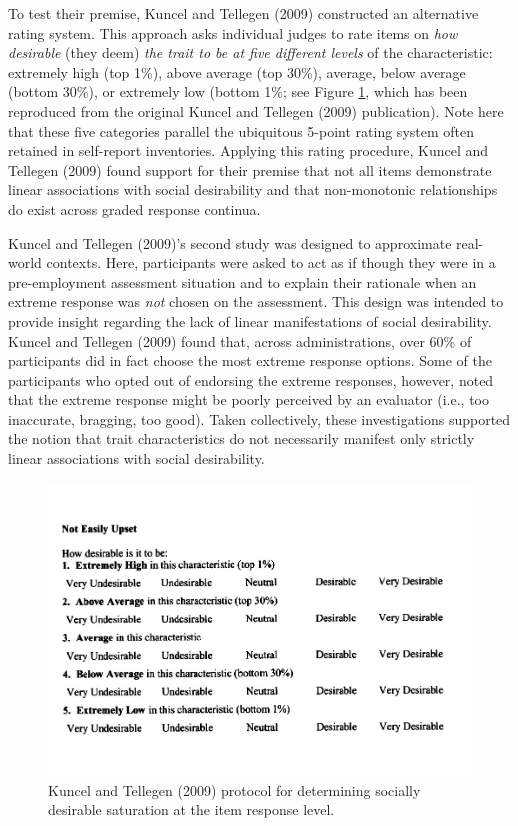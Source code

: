 \documentclass[
  ,jou]{apa6}
\begin{document}
To test their premise, Kuncel and Tellegen (2009) constructed an alternative rating system. This approach asks individual judges to rate items on \emph{how desirable} (they deem) \emph{the trait to be at five different levels} of the characteristic: extremely high (top 1\%), above average (top 30\%), average, below average (bottom 30\%), or extremely low (bottom 1\%; see Figure \ref{fig:Figure1}, which has been reproduced from the original Kuncel and Tellegen (2009) publication). Note here that these five categories parallel the ubiquitous 5-point rating system often retained in self-report inventories. Applying this rating procedure, Kuncel and Tellegen (2009) found support for their premise that not all items demonstrate linear associations with social desirability and that non-monotonic relationships do exist across graded response continua.

Kuncel and Tellegen (2009)'s second study was designed to approximate real-world contexts. Here, participants were asked to act as if though they were in a pre-employment assessment situation and to explain their rationale when an extreme response was \emph{not} chosen on the assessment. This design was intended to provide insight regarding the lack of linear manifestations of social desirability. Kuncel and Tellegen (2009) found that, across administrations, over 60\% of participants did in fact choose the most extreme response options. Some of the participants who opted out of endorsing the extreme responses, however, noted that the extreme response might be poorly perceived by an evaluator (i.e., too inaccurate, bragging, too good). Taken collectively, these investigations supported the notion that trait characteristics do not necessarily manifest only strictly linear associations with social desirability.

\begin{figure}
\centering
\includegraphics{FullStudy_files/figure-latex/Figure1-1.pdf}
\caption{\label{fig:Figure1}Kuncel and Tellegen (2009) protocol for determining socially desirable saturation at the item response level.}
\end{figure}
\end{document}
